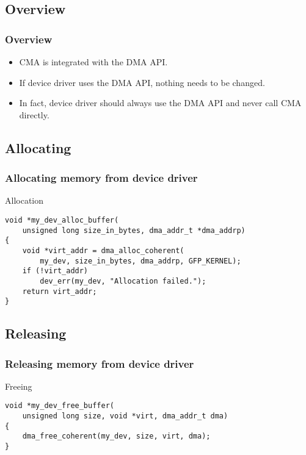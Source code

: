 
\subsection{Overview}

\begin{frame}
  \frametitle{Overview}

  \begin{itemize}
  \item CMA is integrated with the DMA API.
  \item If device driver uses the DMA API, nothing needs to be changed.
  \item In fact, device driver should always use the DMA API and never
    call CMA directly.
  \end{itemize}
\end{frame}

\subsection{Allocating}

\begin{frame}[fragile]
  \frametitle{Allocating memory from device driver}

  \begin{block}{Allocation}
\begin{lstlisting}
void *my_dev_alloc_buffer(
    unsigned long size_in_bytes, dma_addr_t *dma_addrp)
{
    void *virt_addr = dma_alloc_coherent(
        my_dev, size_in_bytes, dma_addrp, GFP_KERNEL);
    if (!virt_addr)
        dev_err(my_dev, "Allocation failed.");
    return virt_addr;
}
\end{lstlisting}
  \end{block}

\end{frame}

\subsection{Releasing}

\begin{frame}[fragile]
  \frametitle{Releasing memory from device driver}

  \begin{block}{Freeing}
\begin{lstlisting}
void *my_dev_free_buffer(
    unsigned long size, void *virt, dma_addr_t dma)
{
    dma_free_coherent(my_dev, size, virt, dma);
}
\end{lstlisting}
  \end{block}
\end{frame}
